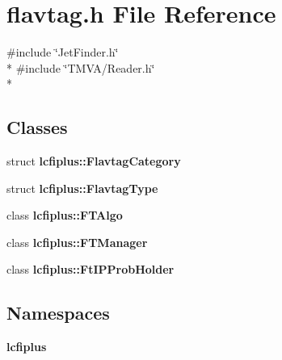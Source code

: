 \section{flavtag.\-h File Reference}
\label{flavtag_8h}
{\ttfamily \#include \char`\"{}Jet\-Finder.\-h\char`\"{}}\\*
{\ttfamily \#include \char`\"{}T\-M\-V\-A/\-Reader.\-h\char`\"{}}\\*
\subsection*{Classes}
\begin{DoxyCompactItemize}
\item 
struct {\bf lcfiplus\-::\-Flavtag\-Category}
\item 
struct {\bf lcfiplus\-::\-Flavtag\-Type}
\item 
class {\bf lcfiplus\-::\-F\-T\-Algo}
\item 
class {\bf lcfiplus\-::\-F\-T\-Manager}
\item 
class {\bf lcfiplus\-::\-Ft\-I\-P\-Prob\-Holder}
\end{DoxyCompactItemize}
\subsection*{Namespaces}
\begin{DoxyCompactItemize}
\item 
{\bf lcfiplus}
\end{DoxyCompactItemize}
